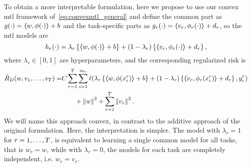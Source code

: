 To obtain a more interpretable formulation, here we propose to use our convex \acrshort{mtl} framework of~\eqref{eq:convexmtl_general} and define the common part as $g(\cdot) =  \bm{\left\langle} w, \phi(\cdot) \bm{\right\rangle} + b$ and the task-specific parts as $g_r(\cdot) = \bm{\left\langle} v_r, \phi_r(\cdot) \bm{\right\rangle} + d_r$, so the \acrshort{mtl} models are
\begin{equation}
    \nonumber
    \label{eq:convexmtl_modeldef}
    h_r(\cdot) = \lambda_r \left\lbrace \dotp{w}{\phi(\cdot)} + b \right\rbrace + (1 - \lambda_r) \left\lbrace \dotp{v_r}{\phi_r(\cdot)} + d_r \right\rbrace ,
\end{equation}
where $\lambda_r \in \left[0, 1\right]$ are hyperparameters, and the corresponding regularized risk is 
\begin{equation}
    \nonumber
    \begin{aligned}
        \hat{R}_{D} ({w, v_1, \ldots, v_T}) = &C \sum_{r=1}^{T} \sum_{i=1}^{m_r} \ell(\lambda_r \left\lbrace \bm{\left\langle} w, \phi(x_i^r) \bm{\right\rangle} + b \right\rbrace + (1 - \lambda_r) \left\lbrace \bm{\left\langle} v_r, \phi_r(x_i^r) \bm{\right\rangle} + d_r \right\rbrace, y_i^r) \\ 
        &\qquad + \left\lVert{w}\right\rVert^2 + \sum_{r=1}^T \left\lVert{v}_r\right\rVert^2 .
    \end{aligned}
\end{equation}
We will name this approach {convex}, in contrast to the {additive} approach of the original formulation.
Here, the interpretation is simpler. The model with $\lambda_r = 1$ for $r=1, \ldots, T$, is equivalent to learning a single common model for all tasks, that is ${w}_r = {w}$, while with $\lambda_r=0$, the models for each task are completely independent, i.e. ${w}_r = {v}_r$.
%


